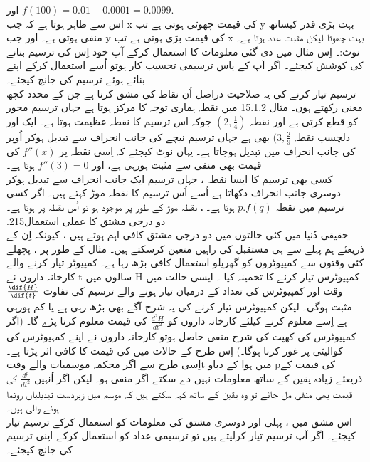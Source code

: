    اور   
     \(f(100)=0.01-0.0001=0.0099.\)\\
اس سے ظاہر ہوتا ہے کہ جب   x کی قیمت چھوٹی ہوتی ہے تب    y بہت بڑی قدر  کیساتھ منفی ہوتی ہے۔ اور جب  y کی قیمت بڑی ہوتی ہے تب  x بہت چھوٹا لیکن مثبت عدد ہوتا ہے۔ \\
نوٹ:۔  اِس مثال میں دی گئی معلومات کا استعمال کرکے آپ خود اِس کی ترسیم بنانے کی کوشش کیجئے۔ اگر آپ کے پاس ترسیمی تحسیب کار  ہوتو اُسے استعمال کرکے اپنے بنائے ہوئے ترسیم کی جانچ کیجئے۔ \\
ترسیم تیار کرنے کی یہ صلاحیت دراصل اُن نقاط کی مشق کرنا ہے جن کے محدد کچھ معنی رکھتے ہوں۔ مثال 15.1.2   میں    نقطہ ہماری توجہ کا مرکز ہوتا ہے جہاں ترسیم   محور کو قطع کرتی ہے اور نقطہ   
\((2, \frac{1}{4})\)
  جوکہ اس ترسیم کا نقطہ عظیمت ہوتا ہے۔  ایک اور دلچسپ نقطہ  
  \((3,\frac{2}{9}\)
   بھی ہے جہاں ترسیم نیچے کی جانب انحراف سے تبدیل ہوکر اُوپر کی جانب انحراف میں تبدیل ہوجاتا ہے۔ یہاں نوٹ کیجئے کہ اِسی نقطہ پر  
   \(f''(x)\)
     کی قیمت بھی منفی سے مثبت ہورہی ہے،  اور 
     \(f''(3)=0\)
       ہوتا ہے۔ \\
کسی بھی ترسیم کا ایسا نقطہ ، جہاں ترسیم ایک جانب انحراف سے تبدیل ہوکر دوسری جانب انحراف دکھاتا ہے اُسے اُس ترسیم کا نقطہ  موڑ  کہتے ہیں۔
اگر کسی ترسیم میں نقطہ 
\(p.f(q)\)
ہوتا ہے۔  
،  نقطہ موڑ کے طور پر موجود ہو تو  اُس نقطہ پر  ہوتا ہے۔   \\
 .215دو درجی مشتق کا عملی استعمال\\
	حقیقی دُنیا میں کئی حالتوں میں دو درجی مشتق کافی اہم ہوتے ہیں ، کیونکہ اِن کے ذریعئے ہم پہلے سے ہی مستقبل کی راہیں متعین کرسکتے ہیں۔ 
		مثال کے طور پر ،  پچھلے کئی وقتوں سے کمپیوٹروں کو گھریلو استعمال کافی بڑھ رہا ہے۔ کمپیوٹر تیار کرنے والے کارخانہ داروں نے    t سالوں میں H   کمپیوٹرس تیار کرنے کا تخمینہ کیا ۔  ایسی حالت میں  وقت اور کمپیوٹرس کی تعداد کے درمیان تیار ہونے والے ترسیم کی تفاوت
		\(\frac{\dif{H}}{\dif{t}}\)
		مثبت ہوگی۔  لیکن کمپیوٹرس تیار کرنے کی یہ شرح آگے بھی بڑھ رہی ہے یا کم ہورہی ہے اِسے معلوم کرنے کیلئے کارخانہ داروں کو    
		\(\frac{d^{2}H}{dt^{2}}\)
		کی قیمت معلوم کرنا پڑے گا۔  (اگر کمپیوٹرس کی کھپت کی شرح منفی حاصل ہوتو کارخانہ داروں نے اپنے کمہیوٹرس کی کوالیٹی پر غور کرنا ہوگا۔) اِس طرح کے حالات میں   کی قیمت کا کافی اثر پڑتا ہے۔ اِسی طرح سے اگر محکمہ موسمیات والے وقتt  میں ہوا کے دباو  pکی قیمت کے ذریعئے زیادہ یقین کے ساتھ معلومات نہیں دے سکتے اگر  منفی ہو۔  لیکن اگر اُنہیں   
		\(\frac{d^{p}}{dt^{2}}\)
		کی قیمت بھی منفی مل جائے تو وہ یقین کے ساتھ کہہ سکتے ہیں کہ موسم میں زبردست تبدیلیاں رونما ہونے والی ہیں۔ \\
اس مشق میں ،  پہلی اور دوسری مشتق کی معلومات کو استعمال کرکے ترسیم تیار کیجئے۔ اگر آپ ترسیم تیار کرلیتے ہیں تو ترسیمی عداد  کو استعمال کرکے اپنی ترسیم کی جانچ کیجئے۔ \\
